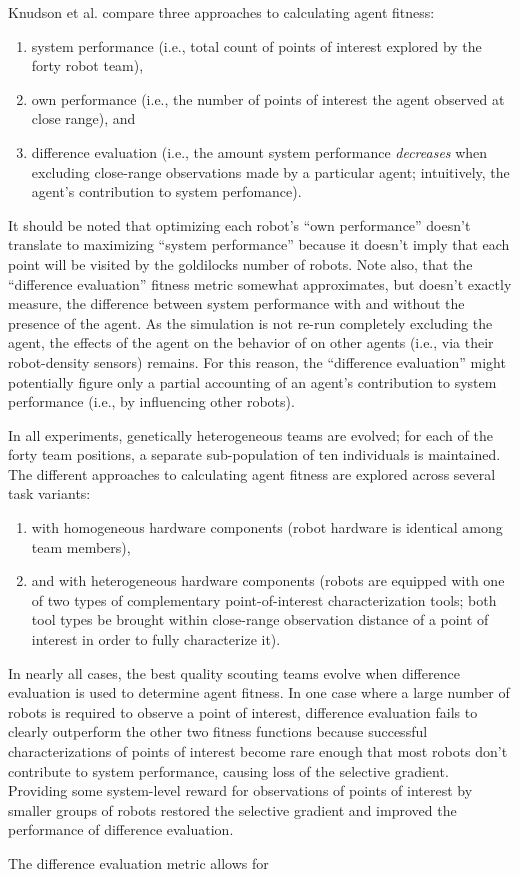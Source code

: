 Knudson et al. compare three approaches to calculating agent fitness:
\begin{enumerate}
\item system performance (i.e., total count of points of interest explored by the forty robot team),
\item own performance (i.e., the number of points of interest the agent observed at close range), and
\item difference evaluation (i.e., the amount system performance \textit{decreases} when excluding close-range observations made by a particular agent; intuitively, the agent's contribution to system perfomance).
\end{enumerate}
It should be noted that optimizing each robot's ``own performance'' doesn't translate to maximizing ``system performance'' because it doesn't imply that each point will be visited by the goldilocks number of robots.
Note also, that the ``difference evaluation'' fitness metric somewhat approximates, but doesn't exactly measure, the difference between system performance with and without the presence of the agent.
As the simulation is not re-run completely excluding the agent, the effects of the agent on the behavior of on other agents (i.e., via their robot-density sensors) remains.
For this reason, the ``difference evaluation'' might potentially figure only a partial accounting of an agent's contribution to system performance (i.e., by influencing other robots).

In all experiments, genetically heterogeneous teams are evolved;
for each of the forty team positions, a separate sub-population of ten individuals is maintained.
The different approaches to calculating agent fitness are explored across several task variants:
\begin{enumerate}
  \item with homogeneous hardware components (robot hardware is identical among team members),
  \item and with heterogeneous hardware components (robots are equipped with one of two types of complementary point-of-interest characterization tools; both tool types be brought within close-range observation distance of a point of interest in order to fully characterize it).
\end{enumerate}
In nearly all cases, the best quality scouting teams evolve when difference evaluation is used to determine agent fitness.
In one case where a large number of robots is required to observe a point of interest, difference evaluation fails to clearly outperform the other two fitness functions because successful characterizations of points of interest become rare enough that most robots don't contribute to system performance, causing loss of the selective gradient.
Providing some system-level reward for observations of points of interest by smaller groups of robots restored the selective gradient and improved the performance of difference evaluation.

The difference evaluation metric allows for
